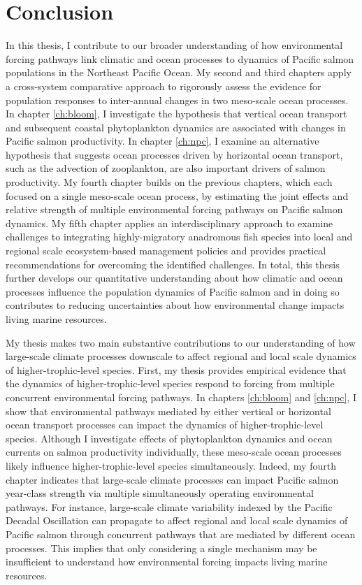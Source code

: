 
\chapter[Conclusion]{Conclusion}
\label{ch:conclude}

In this thesis, I contribute to our broader understanding of how environmental
forcing pathways link climatic and ocean processes to dynamics of Pacific salmon
populations in the Northeast Pacific Ocean. My second and third chapters apply a
cross-system comparative approach to rigorously assess the evidence for
population responses to inter-annual changes in two meso-scale ocean processes.
In chapter \ref{ch:bloom}, I investigate the hypothesis that vertical ocean
transport and subsequent coastal phytoplankton dynamics are associated with
changes in Pacific salmon productivity. In chapter \ref{ch:npc}, I examine an
alternative hypothesis that suggests ocean processes driven by horizontal ocean
transport, such as the advection of zooplankton, are also important drivers of
salmon productivity. My fourth chapter builds on the previous chapters, which
each focused on a single meso-scale ocean process, by estimating the joint
effects and relative strength of multiple environmental forcing pathways on
Pacific salmon dynamics. My fifth chapter applies an interdisciplinary approach
to examine challenges to integrating highly-migratory anadromous fish species
into local and regional scale ecosystem-based management policies and provides
practical recommendations for overcoming the identified challenges. In total,
this thesis further develops our quantitative understanding about how climatic
and ocean processes influence the population dynamics of Pacific salmon and in
doing so contributes to reducing uncertainties about how environmental change
impacts living marine resources.

My thesis makes two main substantive contributions to our understanding of how
large-scale climate processes downscale to affect regional and local scale
dynamics of higher-trophic-level species. First, my thesis provides empirical
evidence that the dynamics of higher-trophic-level species respond to forcing
from multiple concurrent environmental forcing pathways. In chapters
\ref{ch:bloom} and \ref{ch:npc}, I show that environmental pathways mediated by
either vertical or horizontal ocean transport processes can impact the dynamics
of higher-trophic-level species. Although I investigate effects of phytoplankton
dynamics and ocean currents on salmon productivity individually, these
meso-scale ocean processes likely influence higher-trophic-level species
simultaneously. Indeed, my fourth chapter indicates that large-scale climate
processes can impact Pacific salmon year-class strength via multiple
simultaneously operating environmental pathways. For instance, large-scale
climate variability indexed by the Pacific Decadal Oscillation can propagate to
affect regional and local scale dynamics of Pacific salmon through concurrent
pathways that are mediated by different ocean processes. This implies that only
considering a single mechanism may be insufficient to understand how
environmental forcing impacts living marine resources.

